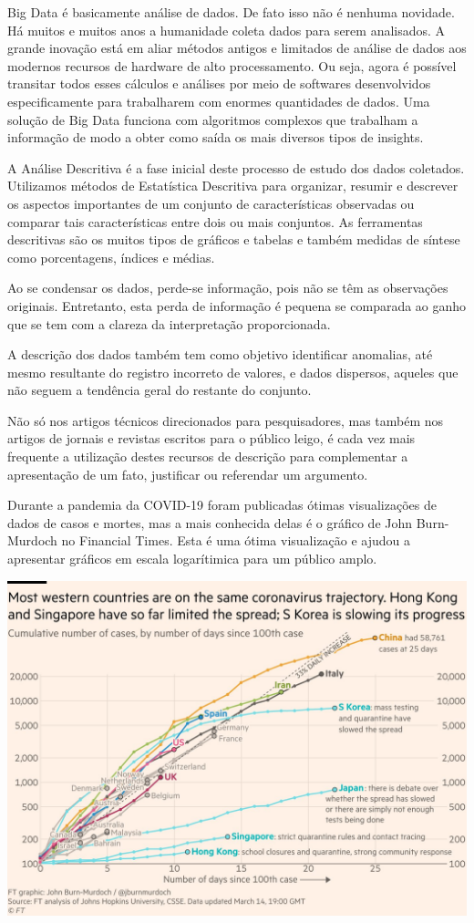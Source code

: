 \documentclass[
]{book}
\begin{document}
Big Data é basicamente análise de dados. De fato isso não é nenhuma novidade. Há muitos e muitos anos a humanidade coleta dados para serem analisados. A grande inovação está em aliar métodos antigos e limitados de análise de dados aos modernos recursos de hardware de alto processamento. Ou seja, agora é possível transitar todos esses cálculos e análises por meio de softwares desenvolvidos especificamente para trabalharem com enormes quantidades de dados. Uma solução de Big Data funciona com algoritmos complexos que trabalham a informação de modo a obter como saída os mais diversos tipos de insights.

A Análise Descritiva é a fase inicial deste processo de estudo dos dados coletados. Utilizamos métodos de Estatística Descritiva para organizar, resumir e descrever os aspectos importantes de um conjunto de características observadas ou comparar tais características entre dois ou mais conjuntos. As ferramentas descritivas são os muitos tipos de gráficos e tabelas e também medidas de síntese como porcentagens, índices e médias.

Ao se condensar os dados, perde-se informação, pois não se têm as observações originais. Entretanto, esta perda de informação é pequena se comparada ao ganho que se tem com a clareza da interpretação proporcionada.

A descrição dos dados também tem como objetivo identificar anomalias, até mesmo resultante do registro incorreto de valores, e dados dispersos, aqueles que não seguem a tendência geral do restante do conjunto.

Não só nos artigos técnicos direcionados para pesquisadores, mas também nos artigos de jornais e revistas escritos para o público leigo, é cada vez mais frequente a utilização destes recursos de descrição para complementar a apresentação de um fato, justificar ou referendar um argumento.

Durante a pandemia da COVID-19 foram publicadas ótimas visualizações de dados de casos e mortes, mas a mais conhecida delas é o gráfico de John Burn-Murdoch no Financial Times. Esta é uma ótima visualização e ajudou a apresentar gráficos em escala logarítimica para um público amplo.

\includegraphics{financial_times.jpg}
\end{document}
